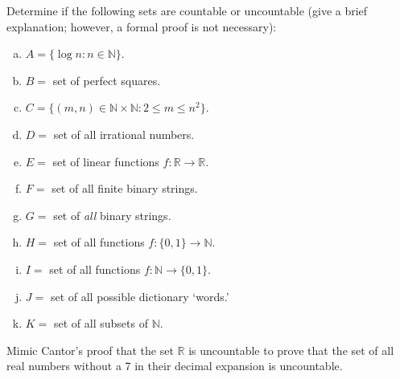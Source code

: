 \documentclass[11pt,letterpaper]{article}
\begin{document}
 Determine if the following sets are countable or uncountable (give a brief explanation; however, a formal proof is not necessary):
\begin{enumerate}[(a)]
\item $A= \{ \log n \colon n \in \mathbb{N} \}$.
\item $B=$ set of perfect squares. 
\item $C= \{ (m, n) \in \mathbb{N} \times \mathbb{N} \colon 2 \leq m \leq n^2 \}$.
\item $D=$ set of all irrational numbers. 
\item $E=$ set of linear functions $f: \mathbb{R} \to \mathbb{R}$.
\item $F=$ set of all finite binary strings. 
\item $G=$ set of {\itshape all} binary strings. 
\item $H=$ set of all functions $f: \{ 0 , 1 \} \to \mathbb{N}$. 
\item $I=$ set of all functions $f: \mathbb{N} \to \{ 0, 1 \}$. 
\item $J=$ set of all possible dictionary `words.' 
\item $K=$ set of all subsets of $\mathbb{N}$.
\end{enumerate}





\newpage





 Mimic Cantor's proof that the set $\mathbb{R}$ is uncountable to prove that the set of all real numbers without a 7 in their decimal expansion is uncountable. 
\end{document}
